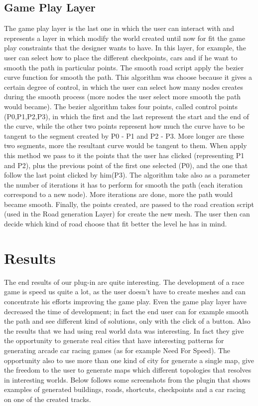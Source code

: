 \documentclass[conference]{IEEEtran}
\begin{document}
\subsection{Game Play Layer}

The game play layer is the last one in which the user can interact with and represents a layer in which modify the world created until now for fit the game play constraints that the designer wants to have. In this layer, for example, the user can select how to place the different checkpoints, cars and if he want to smooth the path in particular points. \newline
The smooth road script apply the bezier curve function for smooth the path. This algorithm was choose because it gives a certain degree of control, in which the user can select how many nodes creates during the smooth process (more nodes the user select more smooth the path would became). The bezier algorithm takes four points, called control points (P0,P1,P2,P3), in which the first and the last represent the start and the end of the curve, while the other two points represent how much the curve have to be tangent to the segment created by P0 - P1 and P2 - P3. More longer are these two segments, more the resultant curve would be tangent to them. When apply this method we pass to it the points that the user has clicked (representing P1 and P2), plus the previous point of the first one selected (P0), and the one that follow the last point clicked by him(P3). The algorithm take also as a parameter the number of iterations it has to perform for smooth the path (each iteration correspond to a new node). More iterations are done, more the path would became smooth. Finally, the points created, are passed to the road creation script (used in the Road generation Layer) for create the new mesh.\newline
The user then can decide which kind of road choose that fit better the level he has in mind.

\section{Results}

The end results of our plug-in are quite interesting. The development of a race game is speed us quite a lot, as the user doesn't have to create meshes  and can  concentrate his efforts improving the game play. Even the game play layer have decreased the time of development; in fact the end user can for example smooth the path and see different kind of solutions, only with the click of a button.\newline
Also the results that we had using real world data was interesting.  In fact they give the opportunity to generate real cities that have interesting patterns for generating arcade car racing games (as for example Need For Speed). The opportunity also to use more than one kind of city for generate a single map, give the freedom to the user to generate maps which different topologies that resolves in interesting worlds. Below follows some screenshots from the plugin that shows examples of generated buildings, roads, shortcuts, checkpoints and a car racing on one of the created tracks.
\end{document}
